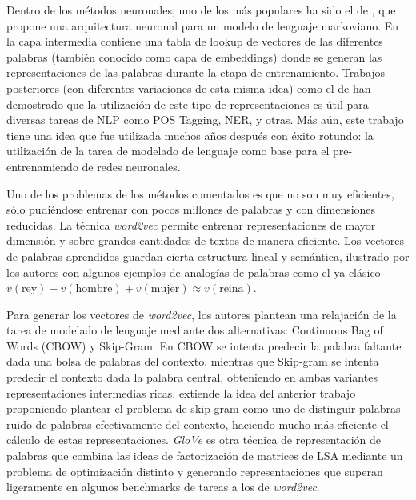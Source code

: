 %

Dentro de los métodos neuronales, uno de los más populares ha sido el de \citet{bengio2003neural}, que propone una arquitectura neuronal para un modelo de lenguaje markoviano. %
En la capa intermedia contiene una tabla de lookup de vectores de las diferentes palabras (también conocido como capa de embeddings) donde se generan las representaciones de las palabras durante la etapa de entrenamiento. Trabajos posteriores (con diferentes variaciones de esta misma idea) como el de \citet{collobert2011natural} han demostrado que la utilización de este tipo de representaciones es útil para diversas tareas de NLP como POS Tagging, NER, y otras. Más aún, este trabajo tiene una idea que fue utilizada muchos años después con éxito rotundo: la utilización de la tarea de modelado de lenguaje como base para el pre-entrenamiendo de redes neuronales.

Uno de los problemas de los métodos comentados es que no son muy eficientes, sólo pudiéndose entrenar con pocos millones de palabras y con dimensiones reducidas. La técnica \emph{word2vec} \cite{mikolov2013efficient} permite entrenar representaciones de mayor dimensión y sobre grandes cantidades de textos de manera eficiente. Los vectores de palabras aprendidos guardan cierta estructura lineal y semántica, ilustrado por los autores con algunos ejemplos de analogías de palabras como el ya clásico $v(\text{rey}) - v(\text{hombre}) + v(\text{mujer}) \approx v(\text{reina})$.

Para generar los vectores de \emph{word2vec}, los autores plantean una relajación de la tarea de modelado de lenguaje mediante dos alternativas: Continuous Bag of Words (CBOW) y Skip-Gram. En CBOW se intenta predecir la palabra faltante dada una bolsa de palabras del contexto, mientras que Skip-gram se intenta predecir el contexto dada la palabra central, obteniendo en ambas variantes representaciones intermedias ricas. \citet{mikolov2013efficient} extiende la idea del anterior trabajo proponiendo plantear el problema de skip-gram como uno de distinguir palabras ruido de palabras efectivamente del contexto, haciendo mucho más eficiente el cálculo de estas representaciones. \emph{GloVe} \cite{pennington2014glove} es otra técnica de representación de palabras que combina las ideas de factorización de matrices de LSA  mediante un problema de optimización distinto y generando representaciones que superan ligeramente en algunos benchmarks de tareas a los de \emph{word2vec}.

